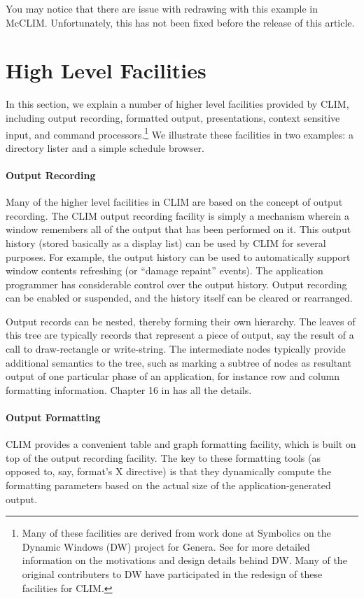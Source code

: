 \documentclass[twocolumn,a4paper]{article}
\newcommand {\code}[1]{{\sffamily #1}}
\newcommand {\CLIM}{{\small CLIM}}
\let\method\code
\begin{document}
You may notice that there are issue with redrawing with this example
in McCLIM. Unfortunately, this has not been fixed before the release
of this article.


\section{High Level Facilities} 

In this section, we explain a number of higher level facilities
provided by \CLIM{}, including output recording, formatted output,
presentations, context sensitive input, and command
processors.\footnote{Many of these facilities are derived from work
  done at Symbolics on the Dynamic Windows (DW) project for
  Genera\cite{prog-ref-manual}. See \cite{presentation-manager} for
  more detailed information on the motivations and design details
  behind DW. Many of the original contributers to DW have participated
  in the redesign of these facilities for \CLIM{}.} We illustrate
these facilities in two examples: a directory lister and a simple
schedule browser.

\paragraph*{Output Recording} Many of the higher level facilities in
\CLIM{} are based on the concept of output recording. The \CLIM{}
output recording facility is simply a mechanism wherein a window
remembers all of the output that has been performed on it. This output
history (stored basically as a display list) can be used by \CLIM{}
for several purposes. For example, the output history can be used to
automatically support window contents refreshing (or ``damage
repaint'' events).  The application programmer has considerable
control over the output history. Output recording can be enabled or
suspended, and the history itself can be cleared or rearranged.

Output records can be nested, thereby forming their own hierarchy. The
leaves of this tree are typically records that represent a piece of
output, say the result of a call to \method{draw-rectangle} or
\method{write-string}. The intermediate nodes typically provide
additional semantics to the tree, such as marking a subtree of nodes
as resultant output of one particular phase of an application, for
instance row and column formatting information. Chapter 16 in
\cite{clim-spec} has all the details.

\paragraph*{Output Formatting} \CLIM{} provides a convenient table and
graph formatting facility, which is built on top of the output
recording facility. The key to these formatting tools (as opposed to,
say, \code{format}'s X directive) is that they dynamically compute the
formatting parameters based on the actual size of the
application-generated output.
\end{document}
